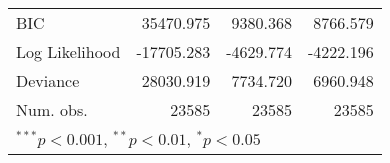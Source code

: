 \begin{tabular}{l D{)}{)}{13)3} D{)}{)}{13)3} D{)}{)}{13)3} }
BIC                                & 35470.975               & 9380.368                & 8766.579                \\
Log Likelihood                     & -17705.283              & -4629.774               & -4222.196               \\
Deviance                           & 28030.919               & 7734.720                & 6960.948                \\
Num. obs.                          & 23585                   & 23585                   & 23585                   \\
\bottomrule
{}
\end{tabular}
